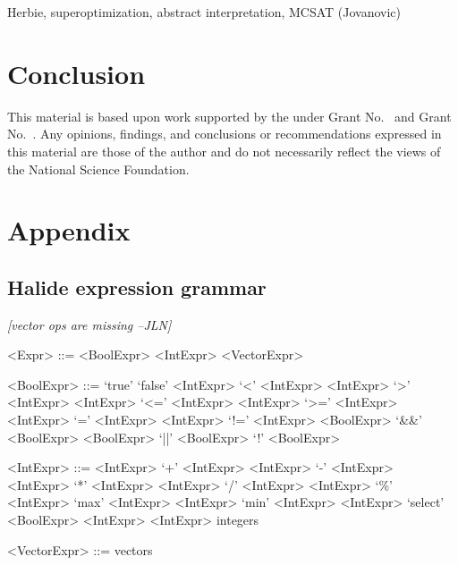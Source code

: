 \documentclass[sigplan,review,anonymous]{acmart}\settopmatter{printfolios=true,printccs=false,printacmref=false}
\newcommand{\jln}[1]{\textcolor{uwpurple}{\textit{[{#1} --JLN]}}}
\begin{document}
Herbie, superoptimization, abstract interpretation, MCSAT (Jovanovic)

\section{Conclusion}


\begin{acks}                            %
  This material is based upon work supported by the
   under Grant
  No.~ and Grant
  No.~.  Any opinions, findings, and
  conclusions or recommendations expressed in this material are those
  of the author and do not necessarily reflect the views of the
  National Science Foundation.
\end{acks}





\appendix
\section{Appendix}

\subsection{Halide expression grammar}
\label{ss:appendixA}

\jln{vector ops are missing}

\begin{grammar}
<Expr> ::= <BoolExpr> 
\alt <IntExpr> 
\alt <VectorExpr>

<BoolExpr> ::= `true'
\alt `false'
\alt <IntExpr> `<' <IntExpr>
\alt <IntExpr> `>' <IntExpr>
\alt <IntExpr> `<=' <IntExpr>
\alt <IntExpr> `>=' <IntExpr>
\alt <IntExpr> `=' <IntExpr>
\alt <IntExpr> `!=' <IntExpr>
\alt <BoolExpr> `&&' <BoolExpr>
\alt <BoolExpr> `||' <BoolExpr>
\alt `!' <BoolExpr>

<IntExpr> ::= <IntExpr> `+' <IntExpr>
\alt <IntExpr> `-' <IntExpr>
\alt <IntExpr> `*' <IntExpr>
\alt <IntExpr> `/' <IntExpr>
\alt <IntExpr> `\%' <IntExpr>
\alt `max' <IntExpr> <IntExpr>
\alt `min' <IntExpr> <IntExpr>
\alt `select' <BoolExpr> <IntExpr> <IntExpr>
\alt integers

<VectorExpr> ::= vectors
\end{grammar}
\end{document}
